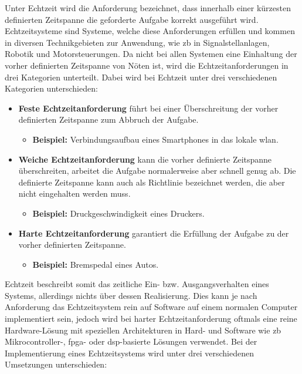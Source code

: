 \documentclass[../EDF Master Thesis.tex]{subfiles}
\begin{document}
    Unter Echtzeit wird die Anforderung bezeichnet, dass innerhalb einer kürzesten definierten Zeitspanne die geforderte Aufgabe korrekt ausgeführt wird.
    Echtzeitsysteme sind Systeme, welche diese Anforderungen erfüllen und kommen in diversen Technikgebieten zur Anwendung, wie \ac{zb} in Signalstellanlagen, Robotik und Motorsteuerungen.
    Da nicht bei allen Systemen eine Einhaltung der vorher definierten Zeitspanne von Nöten ist, wird die Echtzeitanforderungen in drei Kategorien unterteilt.
    Dabei wird bei Echtzeit unter drei verschiedenen Kategorien unterschieden:
    \begin{itemize}
        \item \textbf{Feste Echtzeitanforderung} führt bei einer Überschreitung der vorher definierten Zeitspanne zum Abbruch der Aufgabe.
            \begin{itemize}
                \item \textbf{Beispiel:} Verbindungsaufbau eines Smartphones in das lokale \ac{wlan}.
            \end{itemize}
        \item \textbf{Weiche Echtzeitanforderung} kann die vorher definierte Zeitspanne überschreiten, arbeitet die Aufgabe normalerweise aber schnell genug ab.
            Die definierte Zeitspanne kann auch als Richtlinie bezeichnet werden, die aber nicht eingehalten werden muss.
            \begin{itemize}
                \item \textbf{Beispiel:} Druckgeschwindigkeit eines Druckers.
            \end{itemize}
        \item \textbf{Harte Echtzeitanforderung} garantiert die Erfüllung der Aufgabe zu der vorher definierten Zeitspanne.
        \begin{itemize}
            \item \textbf{Beispiel:} Bremspedal eines Autos.
        \end{itemize}
    \end{itemize}
    Echtzeit beschreibt somit das zeitliche Ein- bzw. Ausgangsverhalten eines Systems, allerdings nichts über dessen Realisierung.
    Dies kann je nach Anforderung das Echtzeitsystem rein auf Software auf einem normalen Computer implementiert sein, jedoch wird bei harter Echtzeitanforderung oftmals eine reine Hardware-Lösung mit speziellen Architekturen in Hard- und Software wie \ac{zb} Mikrocontroller-, \ac{fpga}- oder \ac{dsp}-basierte Lösungen verwendet. 
    Bei der Implementierung eines Echtzeitsystems wird unter drei verschiedenen Umsetzungen unterschieden:
\end{document}
